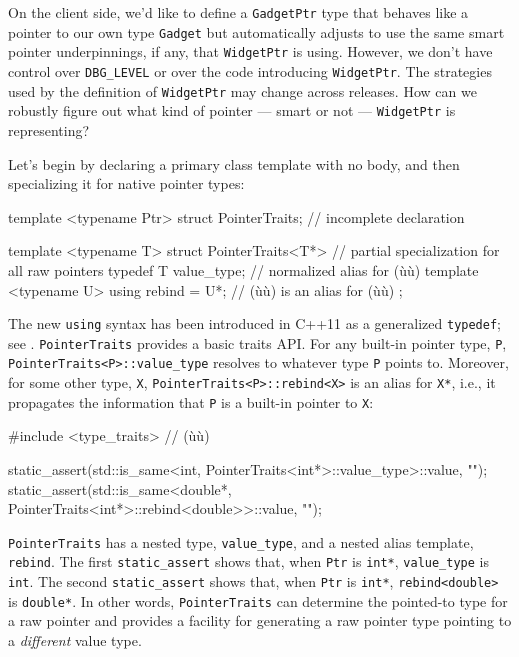 On the client side, we'd like to define a \lstinline!GadgetPtr! type that
behaves like a pointer to our own type \lstinline!Gadget! but automatically
adjusts to use the same smart pointer underpinnings, if any, that
\lstinline!WidgetPtr! is using. However, we don't have control over
\lstinline!DBG_LEVEL! or over the code introducing \lstinline!WidgetPtr!. The
strategies used by the definition of \lstinline!WidgetPtr! may change
across releases. How can we robustly figure out what kind of pointer ---
smart or not --- \lstinline!WidgetPtr! is representing?

Let's begin by declaring a primary class template with no body, and then
specializing it for native pointer types:

\begin{emcppslisting}[emcppsbatch=e40]
template <typename Ptr>
struct PointerTraits;       // incomplete declaration

template <typename T>
struct PointerTraits<T*>   // partial specialization for all raw pointers
{
    typedef T value_type;  // normalized alias for (ù{}ù)
    template <typename U>
    using rebind = U*;     // (ù{}ù) is an alias for (ù{}ù)
};
\end{emcppslisting}
    

\noindent The new \lstinline!using! syntax has been introduced in C++11 as a
generalized \lstinline!typedef!; see . \lstinline!PointerTraits! provides a basic
traits API. For any built-in pointer type, \lstinline!P!,
\lstinline!PointerTraits<P>::value_type! resolves to whatever type
\lstinline!P! points to. Moreover, for some other type, \lstinline!X!,
\lstinline!PointerTraits<P>::rebind<X>! is an alias for \lstinline!X*!, i.e.,
it propagates the information that \lstinline!P! is a built-in pointer to
\lstinline!X!:

\begin{emcppslisting}[emcppsbatch=e40]
#include <type_traits>  // (ù{}ù)

static_assert(std::is_same<int, PointerTraits<int*>::value_type>::value, "");
static_assert(std::is_same<double*,
                           PointerTraits<int*>::rebind<double>>::value, "");
\end{emcppslisting}
    
\lstinline!PointerTraits! has a nested type, \lstinline!value_type!, and a
nested alias template, \lstinline!rebind!. The first
\lstinline!static_assert! shows that, when \lstinline!Ptr! is \lstinline!int*!,
\lstinline!value_type! is \lstinline!int!. The second \lstinline!static_assert!
shows that, when \lstinline!Ptr! is \lstinline!int*!, \lstinline!rebind<double>!
is \lstinline!double*!. In other words, \lstinline!PointerTraits! can
determine the pointed-to type for a raw pointer and provides a facility
for generating a raw pointer type pointing to a \emph{different} value
type.

